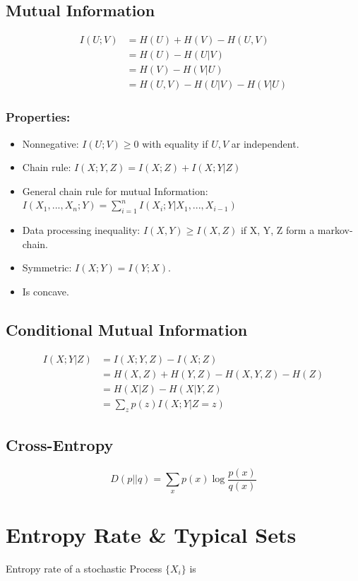 \documentclass[10pt,a4paper,landscape]{article}
\begin{document}
\begin{multicols*}{4}
\subsection{Mutual Information}
\begin{align*}
I(U; V) &= H(U) + H(V) - H(U,V)\\
		&= H(U) - H(U | V)\\
		&= H(V) - H(V | U)\\
		&= H(U,V) - H(U | V) - H (V | U)
\end{align*}

\subsubsection{Properties:}
\begin{itemize}
	\item Nonnegative: $I(U;V) \geq 0$ with equality if $U, V$ ar independent.
	\item Chain rule: $I(X; Y, Z) = I(X;Z) + I(X; Y | Z)$
	\item General chain rule for mutual Information: $I(X_1, ..., X_n; Y) = \sum_{i=1}^n I(X_i; Y | X_1, ..., X_{i-1})$
	\item Data processing inequality: $I(X,Y) \geq I(X, Z)$ if X, Y, Z form a markov-chain.
	\item Symmetric: $I(X;Y) = I(Y;X)$.
	\item Is concave.
\end{itemize}

\subsection{Conditional Mutual Information}
\begin{align*}
I(X;Y|Z) 	&= I(X;Y,Z) - I(X;Z)\\
			&= H(X,Z) + H(Y,Z) - H(X,Y,Z) - H(Z)\\
			&= H(X|Z) - H(X|Y,Z)\\
			&= \sum_z p(z) I(X;Y|Z=z)
\end{align*}
\subsection{Cross-Entropy}
$$ D(p || q) = \sum_x p(x) \log \frac{p(x)}{q(x)}$$

\section{Entropy Rate \& Typical Sets}
Entropy rate of a stochastic Process $\{X_i\}$ is


\end{multicols*}
\end{document}
